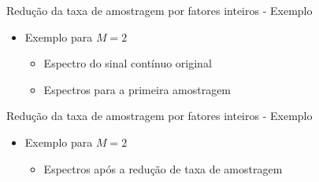 \begin{slide}{Redução da taxa de amostragem por fatores inteiros - Exemplo}
	\begin{itemize}
		\item Exemplo para $M=2$
			\begin{itemize}
				\item Espectro do sinal contínuo original
			\begin{figure}
				\centering
		        \end{figure}
		\item Espectros para a primeira amostragem 
			\begin{figure}
				\centering
		        \end{figure}
			\end{itemize}
	\end{itemize}
\end{slide}

\begin{slide}{Redução da taxa de amostragem por fatores inteiros - Exemplo}
	\begin{itemize}
		\item Exemplo para $M=2$
			\begin{itemize}
		\item Espectros após a redução de taxa de amostragem 
			\begin{figure}
				\centering
		        \end{figure}
			\end{itemize}
	\end{itemize}
\end{slide} 

